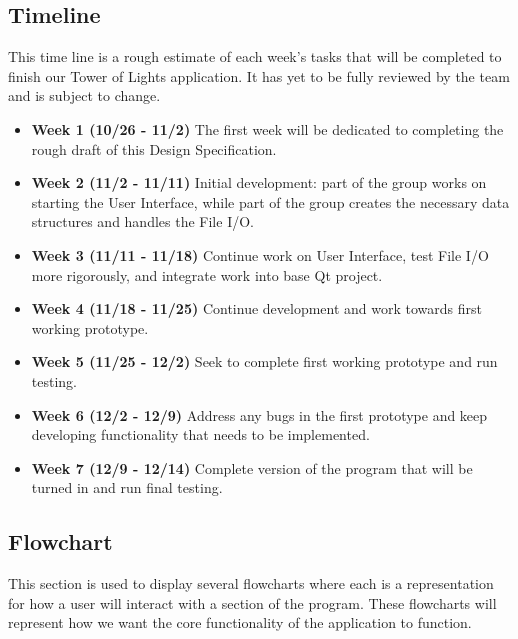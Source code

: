 \documentclass{article}
\begin{document}
\subsection{Timeline}
This time line is a rough estimate of each week's tasks that will be completed to finish our Tower of Lights application. It has yet to be fully reviewed by the team and is subject to change.
	\begin{itemize}
		\item \textbf{Week 1 (10/26 - 11/2)} The first week will be dedicated to completing the rough draft of this Design Specification. 
		\item \textbf{Week 2 (11/2 - 11/11)} Initial development: part of the group works on starting the User Interface, while part of the group creates the necessary data structures and handles the File I/O.
		\item \textbf{Week 3 (11/11 - 11/18)} Continue work on User Interface, test File I/O more rigorously, and integrate work into base Qt project.
		\item \textbf{Week 4 (11/18 - 11/25)} Continue development and work towards first working prototype.
		\item \textbf{Week 5 (11/25 - 12/2)} Seek to complete first working prototype and run testing.
		\item \textbf{Week 6 (12/2 - 12/9)} Address any bugs in the first prototype and keep developing functionality that needs to be implemented.
		\item \textbf{Week 7 (12/9 - 12/14)} Complete version of the program that will be turned in and run final testing.
	\end{itemize}
\subsection{Flowchart}
This section is used to display several flowcharts where each is a representation for how a user will interact with a section of the program. These flowcharts will represent how we want the core functionality of the application to function.
\end{document}
